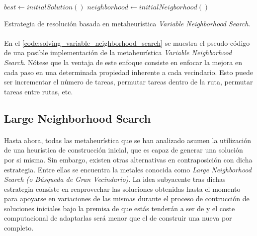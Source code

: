 \documentclass{subfiles}
\begin{document}
        \begin{algorithm}[ht]
          \SetAlgoLined
          $best \gets initialSolution()$\;
          $neighborhood \gets initialNeigborhood()$\;
          \caption{Estrategia de resolución basada en metaheurística \emph{Variable Neighborhood Search}.}
          \label{code:solving_variable_neighborhood_search}
        \end{algorithm}

        \paragraph{}
        En el \cref{code:solving_variable_neighborhood_search} se muestra el pseudo-código de una posible implementación de la metaheurística \emph{Variable Neighborhood Search}. Nótese que la ventaja de este enfoque consiste en enfocar la mejora en cada paso en una determinada propiedad inherente a cada vecindario. Esto puede ser incrementar el número de tareas, permutar tareas dentro de la ruta, permutar tareas entre rutas, etc.

      \subsection{Large Neighborhood Search}
      \label{sec:solving_lns}

        \paragraph{}
        Hasta ahora, todas las metaheurística que se han analizado asumen la utilización de una heurística de construcción inicial, que es capaz de generar una solución por si misma. Sin embargo, existen otras alternativas en contraposición con dicha estrategia. Entre ellas se encuentra la metales conocida como \emph{Large Neighborhood Search (o Búsqueda de Gran Vecindario)}. La idea subyacente tras dichas estrategia consiste en reaprovechar las soluciones obtenidas hasta el momento para apoyarse en variaciones de las mismas durante el proceso de contrucción de soluciones iniciales bajo la premisa de que estás tenderán a ser de  y el coste computacional de adaptarlas será menor que el de construir una nueva por completo.
\end{document}
